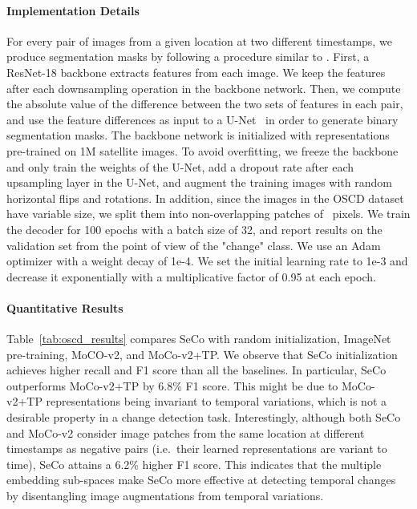 \documentclass[10pt,twocolumn,letterpaper]{article}
\newcommand{\methodname}[0]{SeCo}
\begin{document}
\vspace{-1em}\paragraph{Implementation Details} For every pair of images from a given location at two different timestamps, we produce segmentation masks by following a procedure similar to \citet{daudt2018fully}. First, a ResNet-18 backbone extracts features from each image. We keep the features after each downsampling operation in the backbone network. Then, we compute the absolute value of the difference between the two sets of features in each pair, and use the feature differences as input to a U-Net~\citep{ronneberger2015u} in order to generate binary segmentation masks. The backbone network is initialized with representations pre-trained on 1M satellite images. To avoid overfitting, we freeze the backbone and only train the weights of the U-Net, add a  dropout rate after each upsampling layer in the U-Net, and augment the training images with random horizontal flips and  rotations. In addition, since the images in the OSCD dataset have variable size, we split them into non-overlapping patches of ~pixels. We train the decoder for 100 epochs with a batch size of 32, and report results on the validation set from the point of view of the "change" class. We use an Adam optimizer with a weight decay of 1e-4. We set the initial learning rate to 1e-3 and decrease it exponentially with a multiplicative factor of 0.95 at each epoch.

\vspace{-1em}\paragraph{Quantitative Results}
Table~\ref{tab:oscd_results} compares \methodname{} with random initialization, ImageNet pre-training, MoCO-v2, and MoCo-v2+TP. We observe that \methodname{} initialization achieves higher recall and F1 score than all the baselines. In particular, \methodname{} outperforms MoCo-v2+TP by 6.8\% F1 score. This might be due to MoCo-v2+TP representations being invariant to temporal variations, which is not a desirable property in a change detection task. Interestingly, although both \methodname{} and MoCo-v2 consider image patches from the same location at different timestamps as negative pairs (i.e.\ their learned representations are variant to time), \methodname{} attains a 6.2\% higher F1 score. This indicates that the multiple embedding sub-spaces make \methodname{} more effective at detecting temporal changes by disentangling image augmentations from temporal variations.
\end{document}
